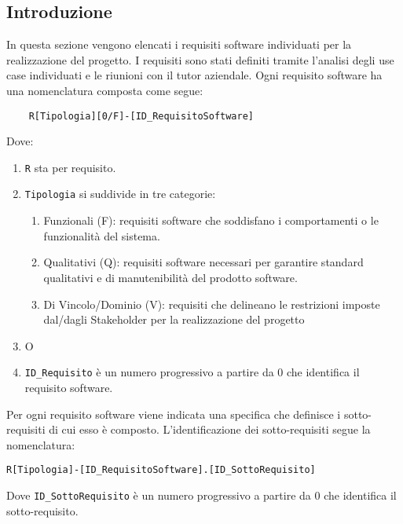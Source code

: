 
\subsection{Introduzione}
\label{sec:introduzione_requisiti_software}
In questa sezione vengono elencati i requisiti software individuati per la realizzazione del progetto.
I requisiti sono stati definiti tramite l'analisi degli use case individuati e le riunioni con il tutor aziendale.
Ogni requisito software ha una nomenclatura composta come segue:
\begin{lstlisting}
    R[Tipologia][0/F]-[ID_RequisitoSoftware]
\end{lstlisting}
Dove:
\begin{enumerate}
    \item \lstinline|R| sta per requisito.
    \item \lstinline|Tipologia| si suddivide in tre categorie:
    \begin{enumerate}
        \item Funzionali (F): requisiti software che soddisfano i comportamenti o le funzionalità del sistema.
        \item Qualitativi (Q): requisiti software necessari per garantire standard qualitativi e di manutenibilità
        del prodotto software.
        \item Di Vincolo/Dominio (V): requisiti che delineano le restrizioni imposte dal/dagli Stakeholder per la realizzazione del progetto
    \end{enumerate}
    \item O 
    \item \lstinline|ID_Requisito| è un numero progressivo a partire da 0 che identifica il requisito software.
\end{enumerate}  
Per ogni requisito software viene indicata una specifica che definisce i sotto-requisiti di cui esso è composto.
L'identificazione dei sotto-requisiti segue la nomenclatura:
\begin{lstlisting}
R[Tipologia]-[ID_RequisitoSoftware].[ID_SottoRequisito]
\end{lstlisting} 
Dove \lstinline|ID_SottoRequisito| è un numero progressivo a partire da 0 che identifica il sotto-requisito.
